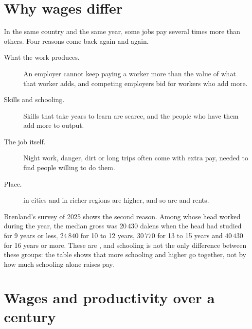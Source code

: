 \section{Why wages differ}

In the same country and the same year, some jobs pay several times more than others. Four reasons
come back again and again.

\begin{description}
  \item[What the work produces.] An employer cannot keep paying a worker more than the value of what
        that worker adds, and competing employers bid for workers who add more.
  \item[Skills and schooling.] Skills that take years to learn are scarce, and the people who have
        them add more to output.
  \item[The job itself.] Night work, danger, dirt or long trips often come with extra pay, needed to
        find people willing to do them.
  \item[Place.]  in cities and in richer regions are higher, and so are  and rents.
\end{description}

Brenland's  survey of 2025 shows the second reason. Among  whose head worked
during the year, the median gross  was $20\,430$ dalens when the head had studied for 9 years
or less, $24\,840$ for 10 to 12 years, $30\,770$ for 13 to 15 years and $40\,430$ for 16 years or
more. These are  , and schooling is not the only difference between these groups:
the table shows that more schooling and higher  go together, not by how much schooling alone
raises pay.

\section{Wages and productivity over a century}

